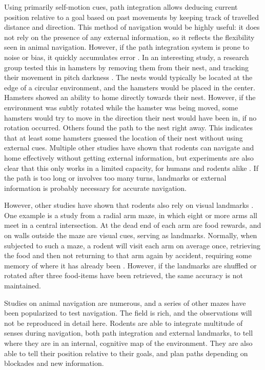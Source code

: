 \documentclass{article}
\begin{document}
    Using primarily self-motion cues, path integration allows deducing current position relative to a goal based on past movements by keeping track of travelled distance and direction. This method of navigation would be highly useful: it does not rely on the presence of any external information, so it reflects the flexibility seen in animal navigation. However, if the path integration system is prone to noise or bias, it quickly accumulates error \parencite{Cheung2007}. In an interesting study, a research group tested this in hamsters by removing them from their nest, and tracking their movement in pitch darkness \parencite{Etienne1986}. The nests would typically be located at the edge of a circular environment, and the hamsters would be placed in the center. Hamsters showed an ability to home directly towards their nest. However, if the environment was subtly rotated while the hamster was being moved, some hamsters would try to move in the direction their nest would have been in, if no rotation occurred. Others found the path to the nest right away. This indicates that at least some hamsters guessed the location of their nest without using external cues. Multiple other studies have shown that rodents can navigate and home effectively without getting external information, but experiments are also clear that this only works in a limited capacity, for humans and rodents alike \parencite{Kim2013}. If the path is too long or involves too many turns, landmarks or external information is probably necessary for accurate navigation.

    However, other studies have shown that rodents also rely on visual landmarks \parencite{Dudchenko2010}. One example is a study from a radial arm maze, in which eight or more arms all meet in a central intersection. At the dead end of each arm are food rewards, and on walls outside the maze are visual cues, serving as landmarks. Normally, when subjected to such a maze, a rodent will visit each arm on average once, retrieving the food and then not returning to that arm again by accident, requiring some memory of where it has already been \parencite{Suzuki1980}. However, if the landmarks are shuffled or rotated after three food-items have been retrieved, the same accuracy is not maintained.

    Studies on animal navigation are numerous, and a series of other mazes have been popularized to test navigation. The field is rich, and the observations will not be reproduced in detail here. Rodents are able to integrate multitude of senses during navigation, both path integration and external landmarks, to tell where they are in an internal, cognitive map of the environment. They are also able to tell their position relative to their goals, and plan paths depending on blockades and new information.
    
\end{document}
